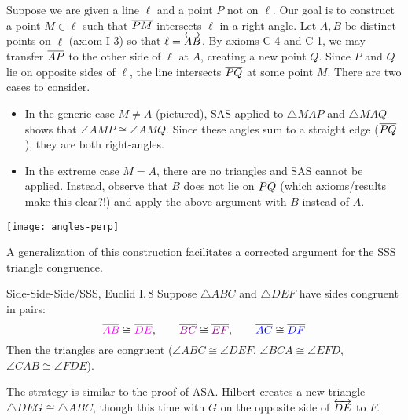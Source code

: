 \begin{minipage}[t]{0.69\linewidth}\vspace{0pt}
	Suppose we are given a line $\ell$ and a point $P$ not on $\ell$. Our goal is to construct a point $M\in\ell$ such that $\overline{PM}$ intersects $\ell$ in a right-angle.\smallbreak
	Let $A,B$ be distinct points on $\ell$ (axiom I-3) so that $\ell=\overleftrightarrow{AB}$.\smallbreak
	By axioms C-4 and C-1, we may transfer \textcolor{blue}{$\overline{AP}$} to the other side of $\ell$ at $A$, creating a new point $Q$.\smallbreak
	Since $P$ and $Q$ lie on opposite sides of $\ell$, the line intersects $\overline{PQ}$ at some point $M$. There are two cases to consider.
	\begin{itemize}
	  \item In the generic case $M\neq A$ (pictured), SAS applied to $\triangle MAP$ and $\triangle MAQ$ shows that $\angle AMP\cong\angle AMQ$. Since these angles sum to a straight edge ($\overline{PQ}$), they are both right-angles.
	  \item	In the extreme case $M=A$, there are no triangles and SAS cannot be applied. Instead, observe that $B$ does not lie on $\overline{PQ}$ (which axioms/results make this clear?!) and apply the above argument with $B$ instead of $A$.
	\end{itemize}
\end{minipage}
\hfill
\begin{minipage}[t]{0.29\linewidth}\vspace{0pt}
	\flushright
	\texttt{[image: angles-perp]}
\end{minipage}
\bigbreak

A generalization of this construction facilitates a corrected argument for the SSS triangle congruence.

\begin{thm}{Side-Side-Side/SSS, Euclid I.\,8}{}
	Suppose $\triangle ABC$ and $\triangle DEF$ have sides congruent in pairs:
	\[
		\textcolor{Magenta}{\cl{AB}}\cong\textcolor{Magenta}{\cl{DE}},\qquad \textcolor{violet}{\cl{BC}}\cong\textcolor{violet}{\cl{EF}},\qquad \textcolor{blue}{\cl{AC}}\cong\textcolor{blue}{\cl{DF}}
	\]
	Then the triangles are congruent ($\angle ABC\cong\angle DEF$, $\angle BCA\cong\angle EFD$, $\angle CAB \cong\angle FDE$).
\end{thm}

The strategy is similar to the proof of ASA. Hilbert creates a new triangle $\triangle DEG\cong\triangle ABC$, though this time with $G$ on the opposite side of $\overleftrightarrow{DE}$ to $F$.


